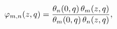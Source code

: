 \[\mathop{\varphi_{m,n}\/}\nolimits\!\left(z,q\right)=\frac{\mathop{\theta_{n}\/%
}\nolimits\!\left(0,q\right)\mathop{\theta_{m}\/}\nolimits\!\left(z,q\right)}{%
\mathop{\theta_{m}\/}\nolimits\!\left(0,q\right)\mathop{\theta_{n}\/}\nolimits%
\!\left(z,q\right)},\]
